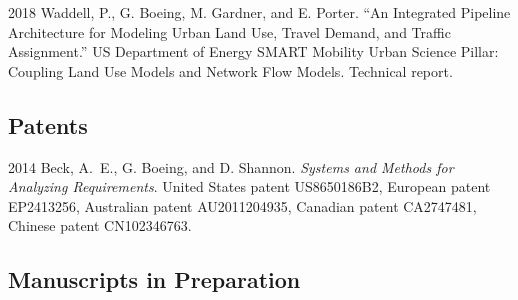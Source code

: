 \documentclass[12pt,letterpaper]{report}
\begin{document}
\begin{tablist}

\item[2018] \tab Waddell, P., G. Boeing, M. Gardner, and E. Porter. \enquote{An Integrated Pipeline Architecture for Modeling Urban Land Use, Travel Demand, and Traffic Assignment.} US Department of Energy SMART Mobility Urban Science Pillar: Coupling Land Use Models and Network Flow Models. Technical report.
	
\end{tablist}



\subsection*{Patents}

\begin{tablist}

\item[2014] \tab Beck, A.~E., G. Boeing, and D. Shannon. \textit{Systems and Methods for Analyzing Requirements}. United States patent US8650186B2, European patent EP2413256, Australian patent AU2011204935, Canadian patent CA2747481, Chinese patent CN102346763.

\end{tablist}



\subsection*{Manuscripts in Preparation}
\end{document}
